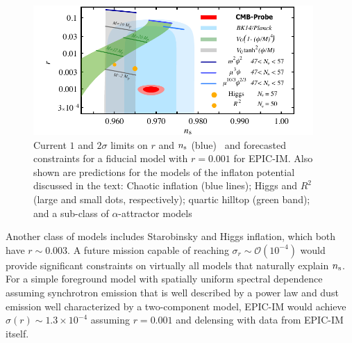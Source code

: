 \begin{figure}[ht!]
\parbox{4.in}{\centerline {
\includegraphics[width=4.2in]{figs/nsrlabeledrp001v2} } }
\hspace{-0.05in}
\parbox{2.5in}{
\caption{ \small \setlength{\baselineskip}{0.95\baselineskip}
Current $1$ and $2\sigma $ limits on $r$ and $n_{\rm s}$ (blue)~\cite{Array:2015xqh} and forecasted constraints for a fiducial model with $r=0.001$ for 
EPIC-IM. Also shown are predictions for the models of the inflaton potential discussed in the text: Chaotic inflation (blue lines); 
Higgs and $R^2$ (large and small dots, respectively);  quartic hilltop (green band); and a sub-class of $\alpha$-attractor
models~\cite{Kallosh:2013hoa}
\label{fig:nsrp001} } }
\end{figure}

Another class of models includes Starobinsky and Higgs inflation, which both have $r\sim0.003$. A future mission 
capable of reaching $\sigma_r\sim\mathcal{O}(10^{-4})$ would provide significant constraints on virtually all models that naturally explain $n_{\rm s}$. For a simple foreground model with spatially uniform spectral dependence assuming synchrotron emission that is well described by a power law and dust emission well characterized by a two-component model, EPIC-IM would achieve $\sigma(r)\sim1.3 \times 10^{-4}$ assuming $r=0.001$ and delensing with data from EPIC-IM itself. 

